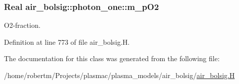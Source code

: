 \subsubsection[{\texorpdfstring{m\+\_\+p\+O2}{m_pO2}}]{\setlength{\rightskip}{0pt plus 5cm}Real air\+\_\+bolsig\+::photon\+\_\+one\+::m\+\_\+p\+O2\hspace{0.3cm}{\ttfamily [protected]}}\hypertarget{classair__bolsig_1_1photon__one_a2324a294be672459b9c7d89297134866}{}\label{classair__bolsig_1_1photon__one_a2324a294be672459b9c7d89297134866}


O2-\/fraction. 



Definition at line 773 of file air\+\_\+bolsig.\+H.



The documentation for this class was generated from the following file\+:\begin{DoxyCompactItemize}
\item 
/home/robertm/\+Projects/plasmac/plasma\+\_\+models/air\+\_\+bolsig/\hyperlink{air__bolsig_8H}{air\+\_\+bolsig.\+H}\end{DoxyCompactItemize}
